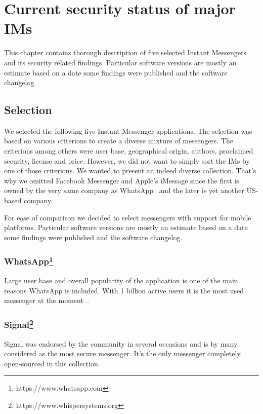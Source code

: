 \documentclass[thesis=M,english]{FITthesis}[2012/10/20]
\begin{document}
\chapter{Current security status of major IMs}\label{compar}

This chapter contains thorough description of five selected Instant Messengers and its security related findings. Particular software versions are mostly an estimate based on a date some findings were published and the software changelog.

\section{Selection}

We selected the following five Instant Messenger applications. The selection was based on various criterions to create a diverse mixture of messengers. The criterions among others were user base, geographical origin, authors, proclaimed security, license and price. However, we did not want to simply sort the IMs by one of those criterions. We wanted to present an indeed diverse collection. That's why we omitted Facebook Messenger and Apple's iMessage since the first is owned by the very same company as WhatsApp~\cite{facebookwhatsappbuy} and the later is yet another US-based company.

For ease of comparison we decided to select messengers with support for mobile platforms. Particular software versions are mostly an estimate based on a date some findings were published and the software changelog.


\subsection{WhatsApp\protect\footnote{https://www.whatsapp.com}}

Large user base and overall popularity of the application is one of the main reasons WhatsApp is included. With 1 billion active users it is the most used messenger at the moment~\cite{whatsappusers}.

\subsection{Signal\protect\footnote{https://www.whispersystems.org}}

Signal was endorsed by the community in several occasions and is by many considered as the most secure messenger. It's the only messenger completely open-sourced in this collection.
\end{document}
